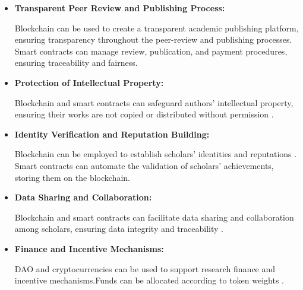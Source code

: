 \documentclass[lettersize,journal]{IEEEtran}
\begin{document}
\begin{itemize}
  \item \textbf{Transparent Peer Review and Publishing Process:} 
  
  Blockchain can be used to create a transparent academic publishing platform, ensuring transparency throughout the peer-review and publishing processes.\cite{nakamoto2008bitcoin} Smart contracts can manage review, publication, and payment procedures, ensuring traceability and fairness.

  \item \textbf{Protection of Intellectual Property:}
  
  Blockchain and smart contracts can safeguard authors' intellectual property, ensuring their works are not copied or distributed without permission \cite{gurkaynak2018intellectual}.
  
  \item \textbf{Identity Verification and Reputation Building:} 
  
  Blockchain can be employed to establish scholars' identities and reputations \cite{radziwill2018blockchain}. Smart contracts can automate the validation of scholars' achievements, storing them on the blockchain.
  
  \item \textbf{Data Sharing and Collaboration:} 
  
  Blockchain and smart contracts can facilitate data sharing and collaboration among scholars, ensuring data integrity and traceability \cite{praitheeshan2019security}.
  
  \item \textbf{Finance and Incentive Mechanisms:} 
  
  DAO and cryptocurrencies can be used to support research finance and incentive mechanisms.Funds can be allocated according to token weights \cite{schar2021decentralized}.
\end{itemize}
\end{document}
